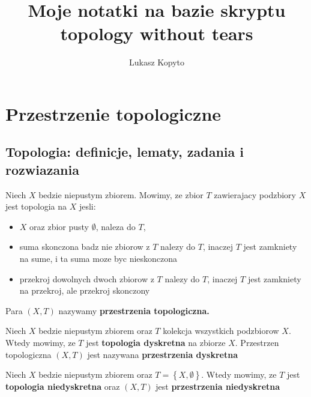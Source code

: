 \documentclass{article}
\author{Lukasz Kopyto}
\title{Moje notatki na bazie skryptu topology without tears}
\begin{document}
\maketitle     %

\section{Przestrzenie topologiczne}
\subsection{Topologia: definicje, lematy, zadania i rozwiazania}
\begin{tcolorbox}[colback=white!90!red,colframe=black!35!red,title=1.1.1 Definicja: Topologia]

Niech $X$ bedzie niepustym zbiorem. Mowimy, ze zbior $T$ zawierajacy podzbiory $X$ jest topologia na $X$ jesli:
\begin{itemize}
\item $X$ oraz zbior pusty $\emptyset$, naleza do $T$,
\item suma skonczona badz nie zbiorow z $T$ nalezy do $T$,
inaczej $T$ jest zamkniety na sume, i ta suma moze byc nieskonczona
\item przekroj dowolnych dwoch zbiorow z $T$ nalezy do $T$, inaczej $T$ jest zamkniety na przekroj, ale przekroj skonczony
\end{itemize}

Para $(X,T)$ nazywamy \textbf{przestrzenia topologiczna.}
\end{tcolorbox}

\begin{tcolorbox}[colback=white!90!red,colframe=black!35!red,title=1.1.6 Definicja: Topologia dyskretna(discrete topology)]

Niech $X$ bedzie niepustym zbiorem oraz $T$ kolekcja wszystkich podzbiorow $X$. Wtedy mowimy, ze $T$ jest \textbf{topologia dyskretna} na zbiorze $X$. Przestrzen topologiczna $(X,T)$ jest nazywana \textbf{przestrzenia dyskretna}
\end{tcolorbox}

\begin{tcolorbox}[colback=white!90!red,colframe=black!35!red,title=1.1.7 Definicja: Topologia niedyskretne(indiscrete topology)]

Niech $X$ bedzie niepustym zbiorem oraz $T= \left\{X, \emptyset\right\}$. Wtedy mowimy, ze $T$ jest \textbf{topologia niedyskretna} oraz $(X,T)$ jest \textbf{przestrzenia niedyskretna} 

\end{tcolorbox}
\end{document}
